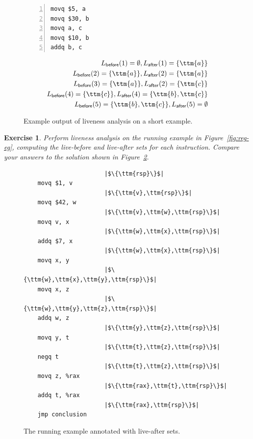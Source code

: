 \documentclass[11pt]{book}
\newtheorem{exercise}[theorem]{Exercise}
\begin{document}
\begin{figure}[tbp]
\begin{minipage}{0.45\textwidth}
\begin{lstlisting}[numbers=left,numberstyle=\tiny]
movq $5, a
movq $30, b
movq a, c
movq $10, b
addq b, c
\end{lstlisting}
\end{minipage}
\vrule\hspace{10pt}
\begin{minipage}{0.45\textwidth}
\begin{align*}
L_{\mathsf{before}}(1)=  \emptyset, 
L_{\mathsf{after}}(1)=  \{\ttm{a}\}\\
L_{\mathsf{before}}(2)=  \{\ttm{a}\},
L_{\mathsf{after}}(2)=  \{\ttm{a}\}\\
L_{\mathsf{before}}(3)=  \{\ttm{a}\},
L_{\mathsf{after}}(2)=  \{\ttm{c}\}\\
L_{\mathsf{before}}(4)=  \{\ttm{c}\},
L_{\mathsf{after}}(4)=  \{\ttm{b},\ttm{c}\}\\
L_{\mathsf{before}}(5)=  \{\ttm{b},\ttm{c}\},
L_{\mathsf{after}}(5)=  \emptyset
\end{align*}
\end{minipage}
\caption{Example output of liveness analysis on a short example.}
\label{fig:liveness-example-0}
\end{figure}

\begin{exercise}\normalfont
  Perform liveness analysis on the running example in
  Figure~\ref{fig:reg-eg}, computing the live-before and live-after
  sets for each instruction. Compare your answers to the solution
  shown in Figure~\ref{fig:live-eg}.
\end{exercise}

\begin{figure}[tp]
\hspace{20pt}
\begin{minipage}{0.45\textwidth}
\begin{lstlisting}
                       |$\{\ttm{rsp}\}$|    
    movq $1, v
                       |$\{\ttm{v},\ttm{rsp}\}$|    
    movq $42, w
                       |$\{\ttm{v},\ttm{w},\ttm{rsp}\}$|    
    movq v, x
                       |$\{\ttm{w},\ttm{x},\ttm{rsp}\}$|    
    addq $7, x
                       |$\{\ttm{w},\ttm{x},\ttm{rsp}\}$|    
    movq x, y
                       |$\{\ttm{w},\ttm{x},\ttm{y},\ttm{rsp}\}$|    
    movq x, z
                       |$\{\ttm{w},\ttm{y},\ttm{z},\ttm{rsp}\}$|    
    addq w, z
                       |$\{\ttm{y},\ttm{z},\ttm{rsp}\}$|
    movq y, t
                       |$\{\ttm{t},\ttm{z},\ttm{rsp}\}$|    
    negq t
                       |$\{\ttm{t},\ttm{z},\ttm{rsp}\}$|    
    movq z, %rax
                       |$\{\ttm{rax},\ttm{t},\ttm{rsp}\}$|    
    addq t, %rax
                       |$\{\ttm{rax},\ttm{rsp}\}$|
    jmp conclusion
\end{lstlisting}
\end{minipage}

\caption{The running example annotated with live-after sets.}
\label{fig:live-eg}
\end{figure}
\end{document}
